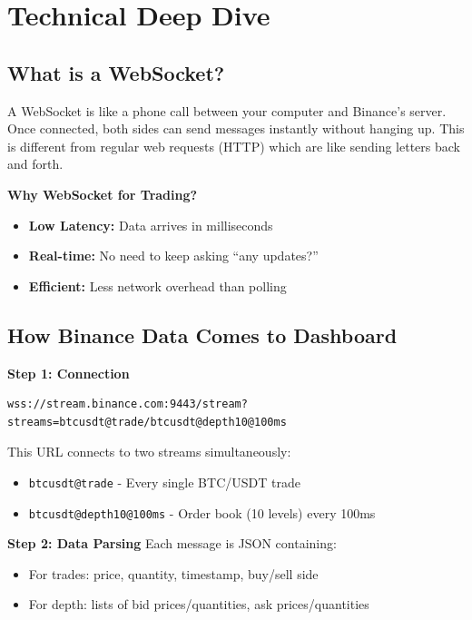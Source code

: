 \documentclass[12pt,a4paper]{article}
\begin{document}
\section{Technical Deep Dive}

\subsection{What is a WebSocket?}

\begin{importantbox}
A WebSocket is like a phone call between your computer and Binance's server. Once connected, both sides can send messages instantly without hanging up. This is different from regular web requests (HTTP) which are like sending letters back and forth.
\end{importantbox}

\textbf{Why WebSocket for Trading?}
\begin{itemize}
    \item \textbf{Low Latency:} Data arrives in milliseconds
    \item \textbf{Real-time:} No need to keep asking ``any updates?''
    \item \textbf{Efficient:} Less network overhead than polling
\end{itemize}

\subsection{How Binance Data Comes to Dashboard}

\textbf{Step 1: Connection}
\begin{verbatim}
wss://stream.binance.com:9443/stream?streams=btcusdt@trade/btcusdt@depth10@100ms
\end{verbatim}
This URL connects to two streams simultaneously:
\begin{itemize}
    \item \texttt{btcusdt@trade} - Every single BTC/USDT trade
    \item \texttt{btcusdt@depth10@100ms} - Order book (10 levels) every 100ms
\end{itemize}

\textbf{Step 2: Data Parsing}
Each message is JSON containing:
\begin{itemize}
    \item For trades: price, quantity, timestamp, buy/sell side
    \item For depth: lists of bid prices/quantities, ask prices/quantities
\end{itemize}
\end{document}
